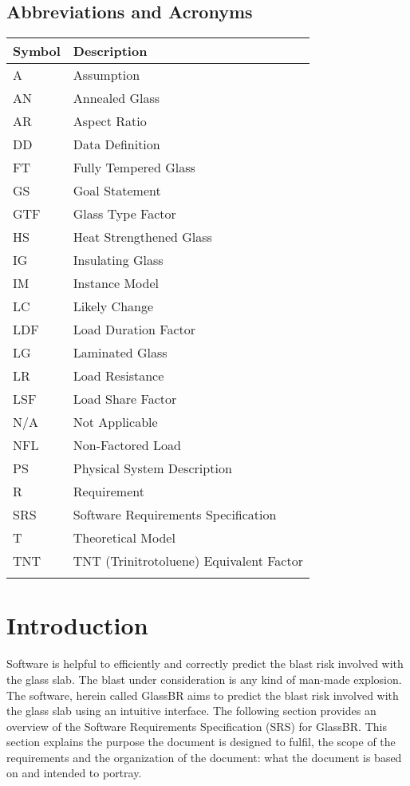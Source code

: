\documentclass[12pt]{article}
\begin{document}
\subsection{Abbreviations and Acronyms}
\label{Sec:AaA}
\begin{longtable*}{l l}
\toprule
Symbol & Description
\\
\midrule
A & Assumption
\\
AN & Annealed Glass
\\
AR & Aspect Ratio
\\
DD & Data Definition
\\
FT & Fully Tempered Glass
\\
GS & Goal Statement
\\
GTF & Glass Type Factor
\\
HS & Heat Strengthened Glass
\\
IG & Insulating Glass
\\
IM & Instance Model
\\
LC & Likely Change
\\
LDF & Load Duration Factor
\\
LG & Laminated Glass
\\
LR & Load Resistance
\\
LSF & Load Share Factor
\\
N/A & Not Applicable
\\
NFL & Non-Factored Load
\\
PS & Physical System Description
\\
R & Requirement
\\
SRS & Software Requirements Specification
\\
T & Theoretical Model
\\
TNT & TNT (Trinitrotoluene) Equivalent Factor
\\
\bottomrule
\label{Table:AaA}
\end{longtable*}
\section{Introduction}
\label{Sec:I}
Software is helpful to efficiently and correctly predict the blast risk involved with the glass slab. The blast under consideration is any kind of man-made explosion. The software, herein called GlassBR aims to predict the blast risk involved with the glass slab using an intuitive interface. The following section provides an overview of the Software Requirements Specification (SRS) for GlassBR. This section explains the purpose the document is designed to fulfil, the scope of the requirements and the organization of the document: what the document is based on and intended to portray.
\end{document}
